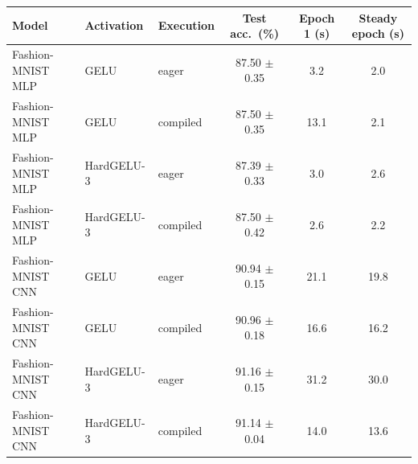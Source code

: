 \begin{tabular}{lllccc}
\toprule
Model & Activation & Execution & Test acc.\ (\%) & Epoch 1 (s) & Steady epoch (s) \\
\midrule
Fashion-MNIST MLP & GELU & eager & 87.50 $\pm$ 0.35 & 3.2 & 2.0 \\
Fashion-MNIST MLP & GELU & compiled & 87.50 $\pm$ 0.35 & 13.1 & 2.1 \\
Fashion-MNIST MLP & HardGELU-3 & eager & 87.39 $\pm$ 0.33 & 3.0 & 2.6 \\
Fashion-MNIST MLP & HardGELU-3 & compiled & 87.50 $\pm$ 0.42 & 2.6 & 2.2 \\
\midrule
Fashion-MNIST CNN & GELU & eager & 90.94 $\pm$ 0.15 & 21.1 & 19.8 \\
Fashion-MNIST CNN & GELU & compiled & 90.96 $\pm$ 0.18 & 16.6 & 16.2 \\
Fashion-MNIST CNN & HardGELU-3 & eager & 91.16 $\pm$ 0.15 & 31.2 & 30.0 \\
Fashion-MNIST CNN & HardGELU-3 & compiled & 91.14 $\pm$ 0.04 & 14.0 & 13.6 \\
\bottomrule
\end{tabular}
